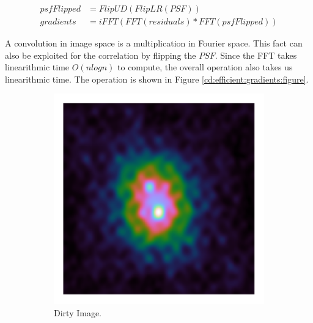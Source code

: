 \begin{equation}\label{cd:efficient:gradients:correlation}
\begin{split}
psfFlipped &= FlipUD(FlipLR(PSF)) \\
gradients &= iFFT(FFT(residuals) * FFT(psfFlipped))
\end{split}
\end{equation}

A convolution in image space is a multiplication in Fourier space. This fact can also be exploited for the correlation by flipping the $PSF$. Since the FFT takes linearithmic time $O(n log n)$ to compute, the overall operation also takes us linearithmic time. The operation is shown in Figure \ref{cd:efficient:gradients:figure}.

\begin{figure}[h]
	\centering
	\begin{subfigure}[b]{0.3\linewidth}
		\includegraphics[width=\linewidth, clip, trim= 0.25in 0.25in 0.25in 0.25in]{./chapters/03.cd/simulated/dirty.png}
		\caption{Dirty Image.}
		\label{cd:efficient:gradients:dirty}
	\end{subfigure}
	\begin{subfigure}[b]{0.3\linewidth}

\end{subfigure}
\end{figure}
